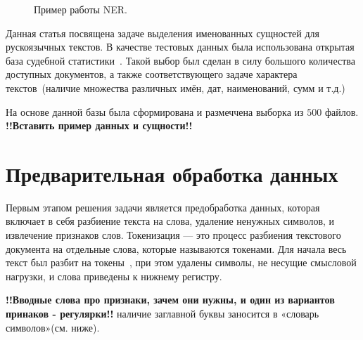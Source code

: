 \documentclass{csmathnotes}
\begin{document}
\begin{figure}[h]
    \caption{Пример работы NER.}
    \label{fig:ner}
\end{figure}


Данная статья посвящена задаче выделения именованных сущностей для рускоязычных текстов.
В качестве тестовых данных была использована открытая база судебной статистики~\cite{CourtsData}.
Такой выбор был сделан в силу большого количества доступных документов, а также соответствующего задаче характера текстов~(наличие множества различных имён, дат, наименований, сумм и т.д.)

На основе данной базы была сформирована и размеччена выборка из $500$ файлов.
{\bf!!Вставить пример данных и сущности!!}

\section*{Предварительная обработка данных}
Первым этапом решения задачи является предобработка данных, которая включает в себя разбиение текста на слова, удаление ненужных символов, и извлечение признаков слов. 
Токенизация — это процесс разбиения текстового документа на отдельные слова, которые называются токенами.
Для начала весь текст был разбит на токены~\cite{Ner}, при этом удалены символы, не несущие смысловой нагрузки, и слова приведены к нижнему регистру.


{\bf!!Вводные слова про признаки, зачем они нужны, и один из вариантов принаков - регулярки!!}
{наличие заглавной буквы заносится в «словарь символов»(см. ниже).}
\end{document}
